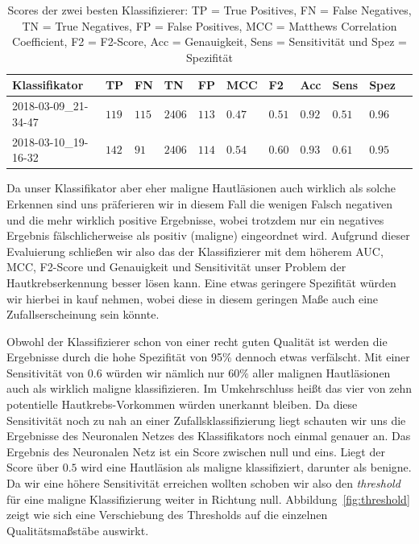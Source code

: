 \begin{table}[htb!]
\begin{center}
\begin{tabular}{lllllllllll}
	\toprule
 	Klassifikator  & TP & FN & TN & FP & MCC & F2 & Acc & Sens & Spez\\
	\midrule
	2018-03-09\_21-34-47 & $119$ &	$115$ &	$2406$ &	$113$ &	$0.47$ &	$0.51$&	$0.92$ &	$0.51$ & $0.96$\\
    2018-03-10\_19-16-32 & $142$&	$91$ &	$2406$ &	$114$ &	$0.54$ 	&$0.60$	&$0.93$	&$0.61$&	$0.95$ \\
 \bottomrule
 \end{tabular}
 \end{center}
  \caption{Scores der zwei besten Klassifizierer: TP = True Positives, FN = False Negatives, TN = True Negatives, FP = False Positives, MCC = Matthews Correlation Coefficient, F2 = F2-Score, Acc = Genauigkeit, Sens = Sensitivität und Spez = Spezifität }
 \label{tab:scores}
 \end{table}
 
 Da unser Klassifikator aber eher maligne Hautläsionen auch wirklich als solche Erkennen sind uns präferieren wir in diesem Fall die wenigen Falsch negativen und die mehr wirklich positive Ergebnisse, wobei trotzdem nur ein negatives Ergebnis fälschlicherweise als positiv (maligne) eingeordnet wird. Aufgrund dieser Evaluierung schließen wir also das der Klassifizierer mit dem höherem AUC, MCC, F2-Score und Genauigkeit und Sensitivität unser Problem der Hautkrebserkennung besser lösen kann. Eine etwas geringere Spezifität würden wir hierbei in kauf nehmen, wobei diese in diesem geringen Maße auch eine Zufallserscheinung sein könnte.
 
Obwohl der Klassifizierer schon von einer recht guten Qualität ist werden die Ergebnisse durch die hohe Spezifität von 95\% dennoch etwas verfälscht. Mit einer Sensitivität von $0.6$ würden wir nämlich nur $60\%$ aller malignen Hautläsionen auch als wirklich maligne klassifizieren. Im Umkehrschluss heißt das vier von zehn potentielle Hautkrebs-Vorkommen würden unerkannt bleiben. Da diese Sensitivität noch zu nah an einer Zufallsklassifizierung liegt schauten wir uns die Ergebnisse des Neuronalen Netzes des  Klassifikators noch einmal genauer an. Das Ergebnis des Neuronalen Netz ist ein Score zwischen null und eins. Liegt der Score über $0.5$ wird eine Hautläsion als maligne klassifiziert, darunter als benigne. Da wir eine höhere Sensitivität erreichen wollten schoben wir also den \textit{threshold} für eine maligne Klassifizierung weiter in Richtung null. Abbildung~\ref{fig:threshold} zeigt wie sich eine Verschiebung des Thresholds auf die einzelnen Qualitätsmaßstäbe auswirkt. 

